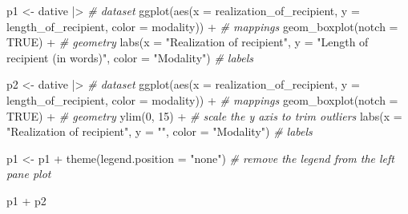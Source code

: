 \documentclass[
  letterpaper,
]{latex/krantz}
\newenvironment{Shaded}{\begin{snugshade}}{\end{snugshade}}
\newcommand{\AttributeTok}[1]{\textcolor[rgb]{0.00,0.00,0.00}{#1}}
\newcommand{\CommentTok}[1]{\textcolor[rgb]{0.00,0.00,0.00}{\textit{#1}}}
\newcommand{\ConstantTok}[1]{\textcolor[rgb]{0.00,0.00,0.00}{#1}}
\newcommand{\DecValTok}[1]{\textcolor[rgb]{0.00,0.00,0.00}{#1}}
\newcommand{\FunctionTok}[1]{\textcolor[rgb]{0.00,0.00,0.00}{#1}}
\newcommand{\NormalTok}[1]{\textcolor[rgb]{0.00,0.00,0.00}{#1}}
\newcommand{\OtherTok}[1]{\textcolor[rgb]{0.00,0.00,0.00}{#1}}
\newcommand{\SpecialCharTok}[1]{\textcolor[rgb]{0.00,0.00,0.00}{#1}}
\newcommand{\StringTok}[1]{\textcolor[rgb]{0.00,0.00,0.00}{#1}}
\begin{document}
\begin{Shaded}
\begin{Highlighting}[]
\NormalTok{p1 }\OtherTok{\textless{}{-}} 
\NormalTok{  dative }\SpecialCharTok{|\textgreater{}} \CommentTok{\# dataset}
  \FunctionTok{ggplot}\NormalTok{(}\FunctionTok{aes}\NormalTok{(}\AttributeTok{x =}\NormalTok{ realization\_of\_recipient, }\AttributeTok{y =}\NormalTok{ length\_of\_recipient, }\AttributeTok{color =}\NormalTok{ modality)) }\SpecialCharTok{+} \CommentTok{\# mappings}
  \FunctionTok{geom\_boxplot}\NormalTok{(}\AttributeTok{notch =} \ConstantTok{TRUE}\NormalTok{) }\SpecialCharTok{+} \CommentTok{\# geometry}
  \FunctionTok{labs}\NormalTok{(}\AttributeTok{x =} \StringTok{"Realization of recipient"}\NormalTok{, }\AttributeTok{y =} \StringTok{"Length of recipient (in words)"}\NormalTok{, }\AttributeTok{color =} \StringTok{"Modality"}\NormalTok{) }\CommentTok{\# labels}

\NormalTok{p2 }\OtherTok{\textless{}{-}} 
\NormalTok{  dative }\SpecialCharTok{|\textgreater{}} \CommentTok{\# dataset}
  \FunctionTok{ggplot}\NormalTok{(}\FunctionTok{aes}\NormalTok{(}\AttributeTok{x =}\NormalTok{ realization\_of\_recipient, }\AttributeTok{y =}\NormalTok{ length\_of\_recipient, }\AttributeTok{color =}\NormalTok{ modality)) }\SpecialCharTok{+} \CommentTok{\# mappings}
  \FunctionTok{geom\_boxplot}\NormalTok{(}\AttributeTok{notch =} \ConstantTok{TRUE}\NormalTok{) }\SpecialCharTok{+} \CommentTok{\# geometry}
  \FunctionTok{ylim}\NormalTok{(}\DecValTok{0}\NormalTok{, }\DecValTok{15}\NormalTok{) }\SpecialCharTok{+} \CommentTok{\# scale the y axis to trim outliers}
  \FunctionTok{labs}\NormalTok{(}\AttributeTok{x =} \StringTok{"Realization of recipient"}\NormalTok{, }\AttributeTok{y =} \StringTok{""}\NormalTok{, }\AttributeTok{color =} \StringTok{"Modality"}\NormalTok{) }\CommentTok{\# labels}

\NormalTok{p1 }\OtherTok{\textless{}{-}}\NormalTok{ p1 }\SpecialCharTok{+} \FunctionTok{theme}\NormalTok{(}\AttributeTok{legend.position =} \StringTok{"none"}\NormalTok{) }\CommentTok{\# remove the legend from the left pane plot}

\NormalTok{p1 }\SpecialCharTok{+}\NormalTok{ p2}
\end{Highlighting}
\end{Shaded}
\end{document}
